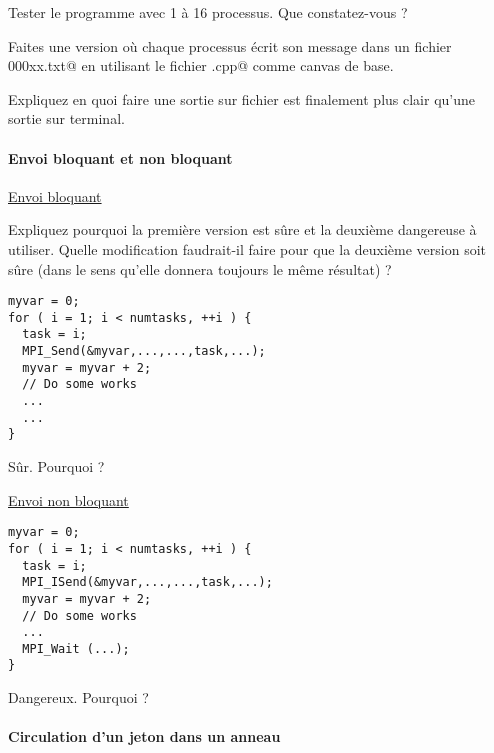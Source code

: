 \documentclass[11pt,a4paper]{article}
\begin{document}
Tester le programme avec 1 à 16 processus. Que constatez-vous ?

Faites une version où chaque processus écrit son message dans un fichier \verb@Output000xx.txt@
en utilisant le fichier \verb@SkeletonMPIProgramWithFilesOutput.cpp@ comme canvas de base.

Expliquez en quoi faire une sortie sur fichier est finalement plus clair qu'une sortie sur terminal.

\paragraph{Envoi bloquant et non bloquant}
\par

\begin{center}\underline{Envoi bloquant}\end{center}

Expliquez pourquoi la première version est sûre et la deuxième dangereuse à utiliser.
Quelle modification faudrait-il faire pour que la deuxième version soit sûre (dans le sens
qu'elle donnera toujours le même résultat) ?

\begin{lstlisting}[style=customcpp]
myvar = 0;
for ( i = 1; i < numtasks, ++i ) {
  task = i;
  MPI_Send(&myvar,...,...,task,...);
  myvar = myvar + 2;
  // Do some works
  ...
  ...
}
\end{lstlisting}

\begin{center}Sûr. Pourquoi ?\end{center}


\begin{center}\underline{Envoi non bloquant}\end{center}

\begin{lstlisting}[style=customcpp]
myvar = 0;
for ( i = 1; i < numtasks, ++i ) {
  task = i;
  MPI_ISend(&myvar,...,...,task,...);
  myvar = myvar + 2;
  // Do some works
  ...
  MPI_Wait (...);
}
\end{lstlisting}

\begin{center}
Dangereux. Pourquoi ?
\end{center}

\paragraph{Circulation d'un jeton dans un anneau}
\end{document}
